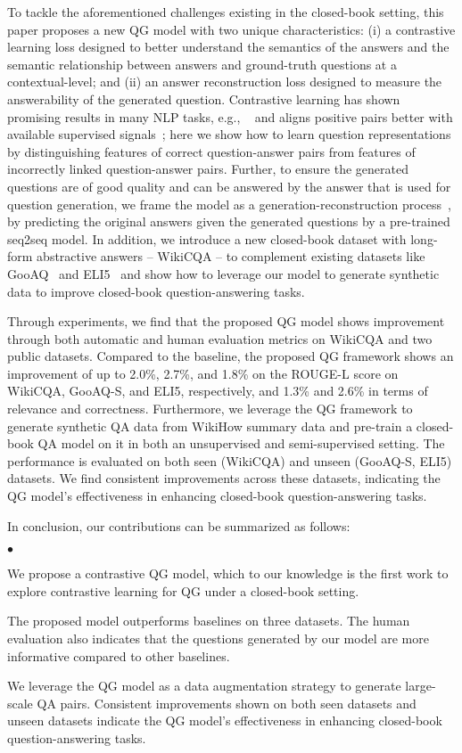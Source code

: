 \documentclass[11pt]{article}
\newcommand{\squishlist}{
 \begin{list}{$\bullet$}
  { \setlength{\itemsep}{0pt}
     \setlength{\parsep}{3pt}
     \setlength{\topsep}{3pt}
     \setlength{\partopsep}{0pt}
     \setlength{\leftmargin}{1.5em}
     \setlength{\labelwidth}{1em}
     \setlength{\labelsep}{0.5em} } }
\newcommand{\squishend}{
\end{list}  }
\begin{document}
To tackle the aforementioned challenges existing in the closed-book setting, this paper proposes a new QG model with two unique characteristics: (i) a contrastive learning loss designed to better understand the semantics of the answers and the semantic relationship between answers and ground-truth questions at a contextual-level; and (ii) an answer reconstruction loss designed to measure the answerability of the generated question. Contrastive learning has shown promising results in many NLP tasks, e.g., ~\cite{giorgi-etal-2021-declutr, gao-etal-2021-simcse, yang-etal-2021-contrastive-representation} and aligns positive pairs better with available supervised signals~\cite{gao-etal-2021-simcse}; here we show how to learn question representations by distinguishing features of correct question-answer pairs from features of incorrectly linked question-answer pairs. Further, to ensure the generated questions are of good quality and can be answered by the answer that is used for question generation, we frame the model as a generation-reconstruction process~\cite{cao-etal-2019-semantic, zhu2020dual}, by predicting the original answers given the generated questions by a pre-trained seq2seq model.
In addition, we introduce a new closed-book dataset with long-form abstractive answers -- WikiCQA -- to complement existing datasets like GooAQ~\cite{khashabi-etal-2021-gooaq-open} and ELI5~\cite{fan-etal-2019-eli5} and show how to leverage our model to generate synthetic data to improve closed-book question-answering tasks.

Through experiments, we find that the proposed QG model shows improvement through both automatic and human evaluation metrics on WikiCQA and two public datasets. Compared to the baseline, the proposed QG framework shows an improvement of up to 2.0\%, 2.7\%, and 1.8\% on the ROUGE-L score on WikiCQA, GooAQ-S, and ELI5, respectively, and 1.3\% and 2.6\% in terms of relevance and correctness. Furthermore, we leverage the QG framework to generate synthetic QA data from WikiHow summary data and pre-train a closed-book QA model on it in both an unsupervised and semi-supervised setting. The performance is evaluated on both seen (WikiCQA) and unseen (GooAQ-S, ELI5) datasets. We find consistent improvements across these datasets, indicating the QG model's effectiveness in enhancing closed-book question-answering tasks. 

In conclusion, our contributions can be summarized as follows:
\squishlist
\item We propose a contrastive QG model, which to our knowledge is the first work to explore contrastive learning for QG under a closed-book setting.
\item The proposed model outperforms baselines on three datasets. The human evaluation also indicates that the questions generated by our model are more informative compared to other baselines.
\item We leverage the QG model as a data augmentation strategy to generate large-scale QA pairs. Consistent improvements shown on both seen datasets and unseen datasets indicate the QG model's effectiveness in enhancing closed-book question-answering tasks.
\squishend
\end{document}
